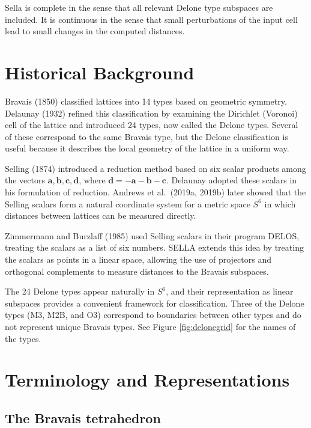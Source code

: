 \documentclass[preprint]{iucr}              %
\begin{document}
	
	
	Sella is complete in the sense that all relevant Delone type subspaces are included.
	It is continuous in the sense that small perturbations of the input cell lead to
	small changes in the computed distances.
	
	
	\section{Historical Background}
	
	Bravais (1850) classified lattices into 14 types based on geometric symmetry.
	Delaunay (1932) refined this classification by examining the Dirichlet (Voronoi)
	cell of the lattice and introduced 24 types, now called the Delone types. Several
	of these correspond to the same Bravais type, but the Delone classification is
	useful because it describes the local geometry of the lattice in a uniform way.
	
	Selling (1874) introduced a reduction method based on six scalar products among
	the vectors $\mathbf{a}, \mathbf{b}, \mathbf{c}, \mathbf{d}$, where
	$\mathbf{d} = -\mathbf{a} - \mathbf{b} - \mathbf{c}$. Delaunay adopted these
	scalars in his formulation of reduction. Andrews et al.\ (2019a, 2019b) later
	showed that the Selling scalars form a natural coordinate system for a metric
	space $S^6$ in which distances between lattices can be measured directly.
	
	Zimmermann and Burzlaff (1985) used Selling scalars in their program DELOS,
	treating the scalars as a list of six numbers. SELLA extends this idea by treating
	the scalars as points in a linear space, allowing the use of projectors and
	orthogonal complements to measure distances to the Bravais subspaces.
	
	The 24 Delone types appear naturally in $S^6$, and their representation as linear
	subspaces provides a convenient framework for classification. Three of the Delone
	types (M3, M2B, and O3) correspond to boundaries between other types and do not
	represent unique Bravais types. See Figure \ref{fig:delonegrid} for the names of the types.
	
	\section{Terminology and Representations}
	
	\subsection{The Bravais tetrahedron}
	
\end{document}
